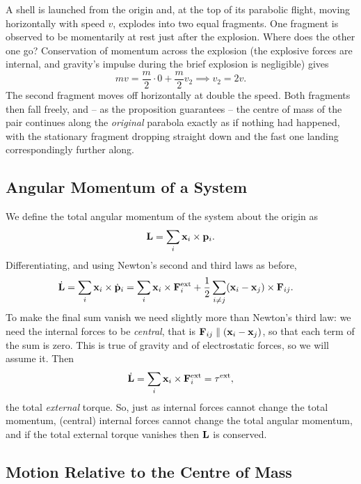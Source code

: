 \documentclass[a4paper]{scrartcl}
\begin{document}
\begin{example}
	A shell is launched from the origin and, at the top of its parabolic flight, moving horizontally with speed $v$, explodes into two equal fragments. One fragment is observed to be momentarily at rest just after the explosion. Where does the other one go? Conservation of momentum across the explosion (the explosive forces are internal, and gravity's impulse during the brief explosion is negligible) gives
	$$
	m v = \frac{m}{2}\cdot 0 + \frac{m}{2}v_2 \implies v_2 = 2v.
	$$
	The second fragment moves off horizontally at double the speed. Both fragments then fall freely, and -- as the proposition guarantees -- the centre of mass of the pair continues along the \emph{original} parabola exactly as if nothing had happened, with the stationary fragment dropping straight down and the fast one landing correspondingly further along.
\end{example}

\subsection{Angular Momentum of a System}

We define the total angular momentum of the system about the origin as
$$
\mathbf{L} = \sum_i \mathbf{x}_i \times \mathbf{p}_i.
$$
Differentiating, and using Newton's second and third laws as before,
\begin{align*}
	\dot{\mathbf{L}} &= \sum_i \mathbf{x}_i \times \dot{\mathbf{p}}_i = \sum_i \mathbf{x}_i \times \mathbf{F}_i^{\text{ext}} + \frac{1}{2}\sum_{i \neq j} (\mathbf{x}_i - \mathbf{x}_j) \times \mathbf{F}_{ij}.
\end{align*}
To make the final sum vanish we need slightly more than Newton's third law: we need the internal forces to be \emph{central}, that is $\mathbf{F}_{ij} \parallel (\mathbf{x}_i - \mathbf{x}_j)$, so that each term of the sum is zero. This is true of gravity and of electrostatic forces, so we will assume it. Then
$$
\dot{\mathbf{L}} = \sum_i \mathbf{x}_i \times \mathbf{F}_i^{\text{ext}} = \mathbf{\tau}^{\text{ext}},
$$
the total \emph{external} torque. So, just as internal forces cannot change the total momentum, (central) internal forces cannot change the total angular momentum, and if the total external torque vanishes then $\mathbf{L}$ is conserved.

\subsection{Motion Relative to the Centre of Mass}
\end{document}
